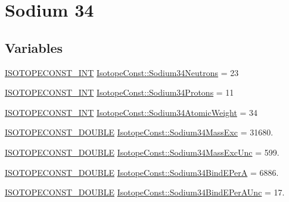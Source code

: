 \hypertarget{group___isotope_const-_sodium-_na34}{}\section{Sodium 34}
\label{group___isotope_const-_sodium-_na34}
\subsection*{Variables}
\begin{DoxyCompactItemize}
\item 
\mbox{\hyperlink{group___isotope_const-_macros_ga5f18360b3e99483a35c32d789e62621c}{I\+S\+O\+T\+O\+P\+E\+C\+O\+N\+S\+T\+\_\+\+I\+NT}} \mbox{\hyperlink{group___isotope_const-_sodium-_na34_gae288e14214f71185f9490577456a6245}{Isotope\+Const\+::\+Sodium34\+Neutrons}} = 23
\item 
\mbox{\hyperlink{group___isotope_const-_macros_ga5f18360b3e99483a35c32d789e62621c}{I\+S\+O\+T\+O\+P\+E\+C\+O\+N\+S\+T\+\_\+\+I\+NT}} \mbox{\hyperlink{group___isotope_const-_sodium-_na34_gadebdfc018fbb123c1482224141387be4}{Isotope\+Const\+::\+Sodium34\+Protons}} = 11
\item 
\mbox{\hyperlink{group___isotope_const-_macros_ga5f18360b3e99483a35c32d789e62621c}{I\+S\+O\+T\+O\+P\+E\+C\+O\+N\+S\+T\+\_\+\+I\+NT}} \mbox{\hyperlink{group___isotope_const-_sodium-_na34_gaa299261ca8c0f3f7ad3e13040160c8b3}{Isotope\+Const\+::\+Sodium34\+Atomic\+Weight}} = 34
\item 
\mbox{\hyperlink{group___isotope_const-_macros_ga8f45a7272ce02c0b4c65c44636ed719a}{I\+S\+O\+T\+O\+P\+E\+C\+O\+N\+S\+T\+\_\+\+D\+O\+U\+B\+LE}} \mbox{\hyperlink{group___isotope_const-_sodium-_na34_gac26d554a5c40d0ffd14dd63371053977}{Isotope\+Const\+::\+Sodium34\+Mass\+Exc}} = 31680.
\item 
\mbox{\hyperlink{group___isotope_const-_macros_ga8f45a7272ce02c0b4c65c44636ed719a}{I\+S\+O\+T\+O\+P\+E\+C\+O\+N\+S\+T\+\_\+\+D\+O\+U\+B\+LE}} \mbox{\hyperlink{group___isotope_const-_sodium-_na34_ga057dcb16c03aee23eef35b7854e5387e}{Isotope\+Const\+::\+Sodium34\+Mass\+Exc\+Unc}} = 599.
\item 
\mbox{\hyperlink{group___isotope_const-_macros_ga8f45a7272ce02c0b4c65c44636ed719a}{I\+S\+O\+T\+O\+P\+E\+C\+O\+N\+S\+T\+\_\+\+D\+O\+U\+B\+LE}} \mbox{\hyperlink{group___isotope_const-_sodium-_na34_gac963f5023fc2413122b9eb3f1f18a608}{Isotope\+Const\+::\+Sodium34\+Bind\+E\+PerA}} = 6886.
\item 
\mbox{\hyperlink{group___isotope_const-_macros_ga8f45a7272ce02c0b4c65c44636ed719a}{I\+S\+O\+T\+O\+P\+E\+C\+O\+N\+S\+T\+\_\+\+D\+O\+U\+B\+LE}} \mbox{\hyperlink{group___isotope_const-_sodium-_na34_ga25df1c02922124530fd22e9486b8b3c4}{Isotope\+Const\+::\+Sodium34\+Bind\+E\+Per\+A\+Unc}} = 17.

\end{DoxyCompactItemize}
